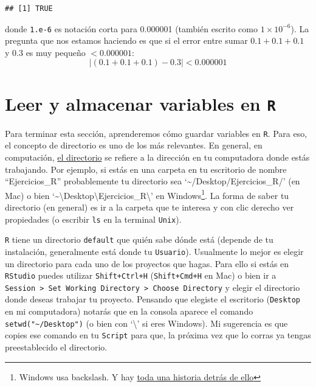 \documentclass[
]{book}
\begin{document}
\begin{verbatim}
## [1] TRUE
\end{verbatim}

donde \texttt{1.e-6} es notación corta para 0.000001 (también escrito como \(1\times 10^{-6}\)). La pregunta que nos estamos haciendo es que si el error entre sumar \(0.1+0.1+0.1\) y \(0.3\) es muy pequeño \(< 0.000001\):
\[
| (0.1 + 0.1 + 0.1) - 0.3 | < 0.000001
\]

\hypertarget{leer-y-almacenar-variables-en-r}{%
\section{\texorpdfstring{Leer y almacenar variables en \texttt{R}}{Leer y almacenar variables en R}}\label{leer-y-almacenar-variables-en-r}}

Para terminar esta sección, aprenderemos cómo guardar variables en \texttt{R}. Para eso, el concepto de directorio es uno de los más relevantes. En general, en computación, \href{https://en.wikipedia.org/wiki/Working_directory}{el directorio} se refiere a la dirección en tu computadora donde estás trabajando. Por ejemplo, si estás en una carpeta en tu escritorio de nombre ``Ejercicios\_R'' probablemente tu directorio sea `\textasciitilde/Desktop/Ejercicios\_R/' (en Mac) o bien `\textasciitilde\textbackslash Desktop\textbackslash Ejercicios\_R\textbackslash{}' en Windows\footnote{Windows usa backslash. Y hay \href{https://www.howtogeek.com/181774/why-windows-uses-backslashes-and-everything-else-uses-forward-slashes/}{toda una historia detrás de ello}}. La forma de saber tu directorio (en general) es ir a la carpeta que te interesa y con clic derecho ver propiedades (o escribir \texttt{ls} en la terminal \texttt{Unix}).

\texttt{R} tiene un directorio \texttt{default} que quién sabe dónde está (depende de tu instalación, generalmente está donde tu \texttt{Usuario}). Usualmente lo mejor es elegir un directorio para cada uno de los proyectos que hagas. Para ello si estás en \texttt{RStudio} puedes utilizar \texttt{Shift+Ctrl+H} (\texttt{Shift+Cmd+H} en Mac) o bien ir a \texttt{Session\ \textgreater{}\ Set\ Working\ Directory\ \textgreater{}\ Choose\ Directory} y elegir el directorio donde deseas trabajar tu proyecto. Pensando que elegiste el escritorio (\texttt{Desktop} en mi computadora) notarás que en la consola aparece el comando \texttt{setwd("\textasciitilde{}/Desktop")} (o bien con `\textbackslash{}' si eres Windows). Mi sugerencia es que copies ese comando en tu \texttt{Script} para que, la próxima vez que lo corras ya tengas preestablecido el directorio.
\end{document}
